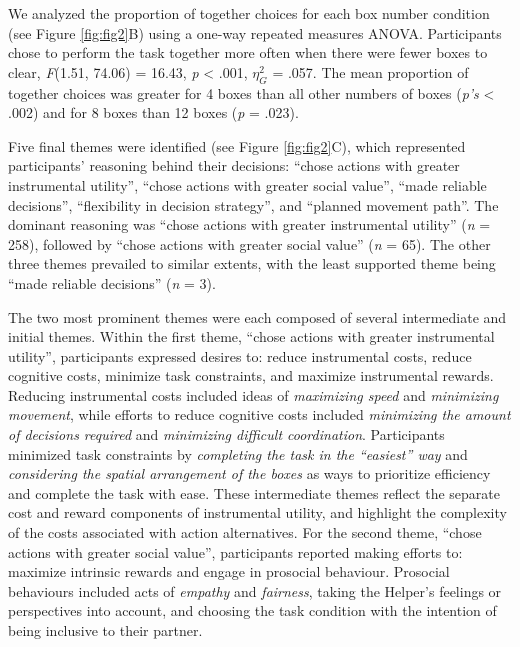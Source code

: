 \documentclass[
  man,
  floatsintext,
  longtable,
  nolmodern,
  notxfonts,
  notimes,
  colorlinks=true,linkcolor=blue,citecolor=blue,urlcolor=blue]{apa7}
\begin{document}
\clearpage

We analyzed the proportion of together choices for each box number
condition (see Figure \ref{fig:fig2}B) using a one-way repeated measures
ANOVA. Participants chose to perform the task together more often when
there were fewer boxes to clear, \emph{F}(1.51, 74.06) = 16.43, \emph{p}
\textless{} .001, \(\eta_{G}^{2}\) = .057. The mean proportion of
together choices was greater for 4 boxes than all other numbers of boxes
(\emph{p's} \textless{} .002) and for 8 boxes than 12 boxes (\emph{p} =
.023).

Five final themes were identified (see Figure \ref{fig:fig2}C), which
represented participants' reasoning behind their decisions: ``chose
actions with greater instrumental utility'', ``chose actions with
greater social value'', ``made reliable decisions'', ``flexibility in
decision strategy'', and ``planned movement path''. The dominant
reasoning was ``chose actions with greater instrumental utility''
(\emph{n} = 258), followed by ``chose actions with greater social
value'' (\emph{n} = 65). The other three themes prevailed to similar
extents, with the least supported theme being ``made reliable
decisions'' (\emph{n} = 3).

The two most prominent themes were each composed of several intermediate
and initial themes. Within the first theme, ``chose actions with greater
instrumental utility'', participants expressed desires to: reduce
instrumental costs, reduce cognitive costs, minimize task constraints,
and maximize instrumental rewards. Reducing instrumental costs included
ideas of \emph{maximizing speed} and \emph{minimizing movement}, while
efforts to reduce cognitive costs included \emph{minimizing the amount
of decisions required} and \emph{minimizing difficult coordination}.
Participants minimized task constraints by \emph{completing the task in
the ``easiest'' way} and \emph{considering the spatial arrangement of
the boxes} as ways to prioritize efficiency and complete the task with
ease. These intermediate themes reflect the separate cost and reward
components of instrumental utility, and highlight the complexity of the
costs associated with action alternatives. For the second theme, ``chose
actions with greater social value'', participants reported making
efforts to: maximize intrinsic rewards and engage in prosocial
behaviour. Prosocial behaviours included acts of \emph{empathy} and
\emph{fairness}, taking the Helper's feelings or perspectives into
account, and choosing the task condition with the intention of being
inclusive to their partner.
\end{document}
